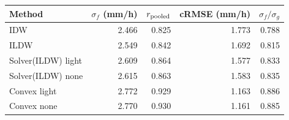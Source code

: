 \begin{tabular}{lrrrr}\toprule
Method & $\sigma_f$ (mm/h) & $r_{\rm pooled}$ & cRMSE (mm/h) & $\sigma_f/\sigma_g$ \\ \midrule
IDW & 2.466 & 0.825 & 1.773 & 0.788 \\
ILDW & 2.549 & 0.842 & 1.692 & 0.815 \\
Solver(ILDW) light & 2.609 & 0.864 & 1.577 & 0.833 \\
Solver(ILDW) none & 2.615 & 0.863 & 1.583 & 0.835 \\
Convex light & 2.772 & 0.929 & 1.163 & 0.886 \\
Convex none & 2.770 & 0.930 & 1.161 & 0.885 \\
\bottomrule\end{tabular}
